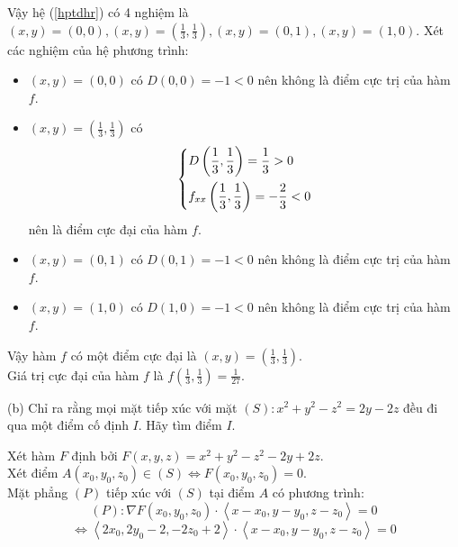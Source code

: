 \documentclass[12pt,a4paper]{article}
\begin{document}
Vậy hệ (\ref{hptdhr}) có 4 nghiệm là \(\left( {x,y} \right) = \left( {0,0} \right),\left( {x,y} \right) = \left( {\frac{1}{3},\frac{1}{3}} \right),\left( {x,y} \right) = \left( {0,1} \right),\left( {x,y} \right) = \left( {1,0} \right).\)
Xét các nghiệm của hệ phương trình:
\begin{itemize}
\item \(\left( {x,y} \right) = \left( {0,0} \right)\) có \(D\left( {0,0} \right) =  - 1 < 0\) nên không là điểm cực trị của hàm \(f.\)
\item  \(\left( {x,y} \right) = \left( {\frac{1}{3},\frac{1}{3}} \right)\) có
\[\left\{ \begin{gathered}
  D\left( {\frac{1}{3},\frac{1}{3}} \right) = \frac{1}{3} > 0 \hfill \\
  {f_{xx}}\left( {\frac{1}{3},\frac{1}{3}} \right) =  - \frac{2}{3} < 0 \hfill \\ 
\end{gathered}  \right.\] nên là điểm cực đại của hàm \(f.\)
\item \(\left( {x,y} \right) = \left( {0,1} \right)\) có \(D\left( {0,1} \right) =  - 1 < 0\) nên không là điểm cực trị của hàm \(f.\)
\item \(\left( {x,y} \right) = \left( {1,0} \right)\) có \(D\left( {1,0} \right) =  - 1 < 0\) nên không là điểm cực trị của hàm \(f.\)
\end{itemize}
Vậy hàm \(f\) có một điểm cực đại là \(\left( x, y \right) = \left( \frac{1}{3}, \frac{1}{3} \right).\)\\
 Giá trị cực đại của hàm \(f\) là \(f\left( {\frac{1}{3},\frac{1}{3}} \right) = \frac{1}{{27}}.\)
\begin{mybox}
(b) Chỉ ra rằng mọi mặt tiếp xúc với mặt \(\left( S \right):{x^2} + {y^2} - {z^2} = 2y - 2z\) đều đi qua một điểm cố định \(I.\) Hãy tìm điểm \(I.\)
\end{mybox} 
Xét hàm \(F\) định bởi \(F\left( {x,y,z} \right) = {x^2} + {y^2} - {z^2} - 2y + 2z.\)\\
Xét điểm \(A\left( {{x_0},{y_0},{z_0}} \right) \in \left( S \right) \Leftrightarrow F\left( {{x_0},{y_0},{z_0}} \right) = 0.\)\\
Mặt phẳng \(\left( P \right)\) tiếp xúc với \(\left( S \right)\) tại điểm \(A\) có phương trình:
\[\left( P \right):\nabla F\left( {{x_0},{y_0},{z_0}} \right) \cdot \left\langle {x - {x_0},y - {y_0},z - {z_0}} \right\rangle  = 0\]
\[ \Leftrightarrow \left\langle {2{x_0},2{y_0} - 2, - 2{z_0} + 2} \right\rangle  \cdot \left\langle {x - {x_0},y - {y_0},z - {z_0}} \right\rangle  = 0\]
\end{document}

